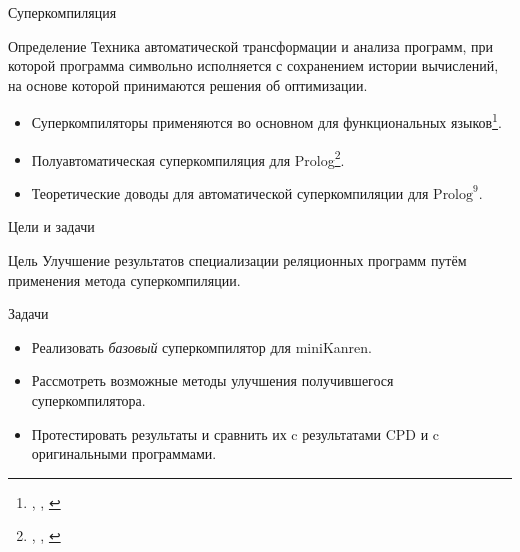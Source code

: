 \documentclass[xcolor=table]{beamer}
\newcommand{\citepres}[1]{{\it \citetitle{#1}}, \citeauthor{#1}, \citeyear{#1}}
\begin{document}
%
\begin{frame}{Суперкомпиляция}

\begin{block}{Определение}
Техника автоматической трансформации и анализа программ, при которой
программа символьно исполняется с сохранением истории вычислений, на основе
которой принимаются решения об оптимизации.
\end{block}

\begin{itemize}
\item Суперкомпиляторы применяются во основном для функциональных языков\footnote{\citepres{scPos}}.
\item Полуавтоматическая суперкомпиляция для Prolog\footnote{\citepres{apropos}}.
\item Теоретические доводы для автоматической суперкомпиляции для $\text{Prolog}^{\text{9}}$.
\end{itemize}

\end{frame}
%
%
\begin{frame}{Цели и задачи}
\begin{block}{Цель}
Улучшение результатов специализации реляционных программ путём применения метода суперкомпиляции.
\end{block}
%
%
\begin{block}{Задачи}
\begin{itemize}
\item Реализовать {\it базовый} суперкомпилятор для miniKanren.
\item Рассмотреть возможные методы улучшения получившегося суперкомпилятора.
\item Протестировать результаты и сравнить их c результатами CPD и c оригинальными программами.
\end{itemize}
\end{block}
\end{frame}
\end{document}
